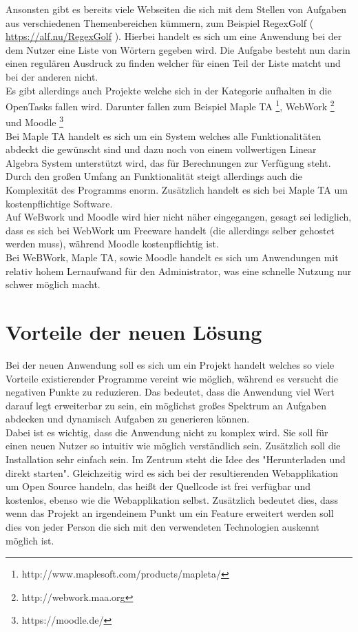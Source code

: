 Ansonsten gibt es bereits viele Webseiten die sich mit dem Stellen von Aufgaben aus verschiedenen Themenbereichen kümmern, zum Beispiel RegexGolf ( \url{https://alf.nu/RegexGolf} ). Hierbei handelt es sich um eine Anwendung bei der dem Nutzer eine Liste von Wörtern gegeben wird. Die Aufgabe besteht nun darin einen regulären Ausdruck zu finden welcher für einen Teil der Liste matcht und bei der anderen nicht. \\

Es gibt allerdings auch Projekte welche sich in der Kategorie aufhalten in die OpenTasks fallen wird. Darunter fallen zum Beispiel Maple TA \footnote{http://www.maplesoft.com/products/mapleta/}, WebWork \footnote{http://webwork.maa.org} und Moodle \footnote{https://moodle.de/} \\
Bei Maple TA handelt es sich um ein System welches alle Funktionalitäten abdeckt die gewünscht sind und dazu noch von einem vollwertigen Linear Algebra System unterstützt wird, das für Berechnungen zur Verfügung steht. Durch den großen Umfang an Funktionalität steigt allerdings auch die Komplexität des Programms enorm. Zusätzlich handelt es sich bei Maple TA um kostenpflichtige Software.\\
Auf WeBwork und Moodle wird hier nicht näher eingegangen, gesagt sei lediglich, dass es sich bei WebWork um Freeware handelt (die allerdings selber gehostet werden muss), während Moodle kostenpflichtig ist. \\
Bei WeBWork, Maple TA, sowie Moodle handelt es sich um Anwendungen mit relativ hohem Lernaufwand für den Administrator, was eine schnelle Nutzung nur schwer möglich macht.


\section{Vorteile der neuen Lösung}

Bei der neuen Anwendung soll es sich um ein Projekt handelt welches so viele Vorteile existierender Programme vereint wie möglich, während es versucht die negativen Punkte zu reduzieren. Das bedeutet, dass die Anwendung viel Wert darauf legt erweiterbar zu sein, ein möglichst großes Spektrum an Aufgaben abdecken und dynamisch Aufgaben zu generieren können. \\
Dabei ist es wichtig, dass die Anwendung nicht zu komplex wird. Sie soll für einen neuen Nutzer so intuitiv wie möglich verständlich sein. Zusätzlich soll die Installation sehr einfach sein. Im Zentrum steht die Idee des "Herunterladen und direkt starten".
Gleichzeitig wird es sich bei der resultierenden Webapplikation um Open Source handeln, das heißt der Quellcode ist frei verfügbar und kostenlos, ebenso wie die Webapplikation selbst. Zusätzlich bedeutet dies, dass wenn das Projekt an irgendeinem Punkt um ein Feature erweitert werden soll dies von jeder Person die sich mit den verwendeten Technologien auskennt möglich ist.

